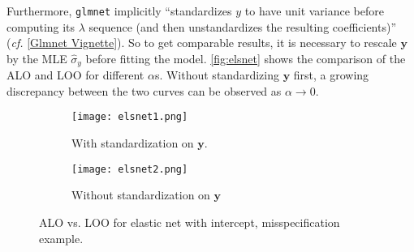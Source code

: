 \documentclass[11pt]{article}
\newcommand{\by}{\bm{y}}
\begin{document}
Furthermore, \verb|glmnet| implicitly ``standardizes \(y\) to have unit variance before computing its \(\lambda\) sequence (and then unstandardizes the resulting coefficients)'' (\emph{cf.} [\href{https://web.stanford.edu/~hastie/glmnet/glmnet_alpha.html}{Glmnet Vignette}]). So to get comparable results, it is necessary to rescale \(\by\) by the MLE \(\hat{\sigma}_y\) before fitting the model. \autoref{fig:elsnet} shows the comparison of the ALO and LOO for different \(\alpha\)s. Without standardizing \(\by\) first, a growing discrepancy between the two curves can be observed as \(\alpha\to0\).
	\begin{figure}[!htbp]
	\centering
	\begin{subfigure}[b]{\textwidth}
		\texttt{[image: elsnet1.png]}
		\caption{With standardization on \(\by\).}
	\end{subfigure}
	\begin{subfigure}[b]{\textwidth}
		\texttt{[image: elsnet2.png]}
		\caption{Without standardization on \(\by\)}
	\end{subfigure}
	\caption{ALO vs. LOO for elastic net with intercept, misspecification example.\label{fig:elsnet}}
	\end{figure}
\end{document}
